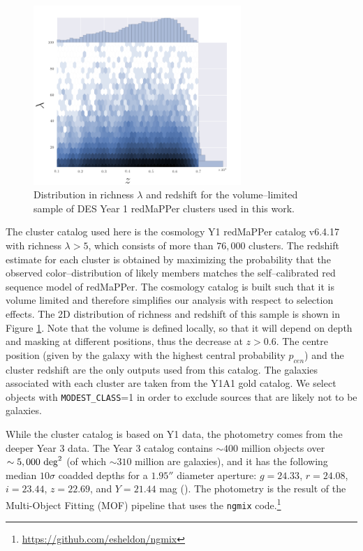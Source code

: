 \begin{figure}\centering\includegraphics[width=0.7\textwidth]{./chapters/chapter5/figs/f2.png}\caption{Distribution in richness $\lambda$ and redshift for the volume--limited sample of DES Year 1 redMaPPer clusters used in this work.}\label{fig:clusters}\end{figure}

The cluster catalog used here is the cosmology Y1 redMaPPer catalog v6.4.17 with richness $\lambda>5$, which consists of more than $76,000$ clusters. The redshift estimate for each cluster is obtained by maximizing the probability that the observed color--distribution of likely members matches the self--calibrated red sequence model of redMaPPer. The cosmology catalog is built such that it is volume limited and therefore simplifies our analysis with respect to selection effects.
The 2D distribution of richness and redshift of this sample is shown in Figure \ref{fig:clusters}. Note that the volume is defined locally, so that it will depend on depth and masking at different positions, thus the decrease at $z>0.6$. The centre position (given by the galaxy with the highest central probability $p_{cen}$) and the cluster redshift are the only outputs used from this catalog.
The galaxies associated with each cluster are taken from the Y1A1 gold catalog. We select objects with \texttt{MODEST\_CLASS}=1 in order to exclude sources that are likely not to be galaxies. 

While the cluster catalog is based on Y1 data, the photometry comes from the deeper Year 3 data. The Year 3 catalog contains $\sim 400$ million objects over $\sim 5,000~{\rm deg}^2$ (of which $\sim 310$ million are galaxies), and it has the following median $10\sigma$ coadded depths for a $1.95''$ diameter aperture: $g = 24.33$, $r = 24.08$, $i = 23.44$, $z = 22.69$, and $Y = 21.44$ mag (\citealt{dr1}). The photometry  is the result of the Multi-Object Fitting (MOF) pipeline that uses the \texttt{ngmix} code.\footnote{\url{https://github.com/esheldon/ngmix}}

